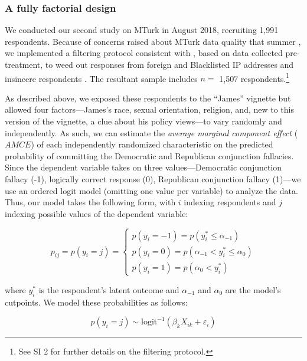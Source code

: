 \documentclass[12pt, letterpaper]{article}
\begin{document}
\subsubsection{A fully factorial design}

We conducted our second study on MTurk in August 2018, recruiting 1,991 respondents. Because of concerns raised about MTurk data quality that summer \citep[e.g.,][]{bai_2018, ryan_2018}, we implemented a filtering protocol consistent with \citet{ahler2019turk_nyu}, based on data collected pre-treatment, to weed out responses from foreign and Blacklisted IP addresses and insincere respondents \citep[e.g.,][]{lopezhillygus_2018}. The resultant sample includes $n=$ 1,507 respondents.\footnote{See SI 2 for further details on the filtering protocol.} 

As described above, we exposed these respondents to the ``James'' vignette but allowed four factors---James's race, sexual orientation, religion, and, new to this version of the vignette, a clue about his policy views---to vary randomly and independently. As such, we can estimate the \emph{average marginal component effect} ($AMCE$) of each independently randomized characteristic on the predicted probability of committing the Democratic and Republican conjunction fallacies. Since the dependent variable takes on three values---Democratic conjunction fallacy (-1), logically correct response (0), Republican conjunction fallacy (1)---we use an ordered logit model (omitting one value per variable) to analyze the data. Thus, our model takes the following form, with $i$ indexing respondents and $j$ indexing possible values of the dependent variable:

\begin{equation}
p_{ij} = p(y_{i} = j) =
    \begin{cases}
p(y_{i} = -1) = p(y_{i}^{*} \leq \alpha_{-1}) \\
p(y_{i} = 0) = p(\alpha_{-1} < y_{i}^{*} \leq \alpha_{0}) \\
p(y_{i} = 1) = p(\alpha_{0} < y_{i}^{*})
    \end{cases}
\end{equation}

\noindent where $y^{*}_{i}$ is the respondent's latent outcome and $\alpha_{-1}$ and $\alpha_{0}$ are the model's cutpoints. We model these probabilities as follows:

\begin{equation}
p(y_{i} = j) \sim \text{logit}^{-1}(\beta_{k}X_{ik} + \varepsilon_{i})
\end{equation}
\end{document}
